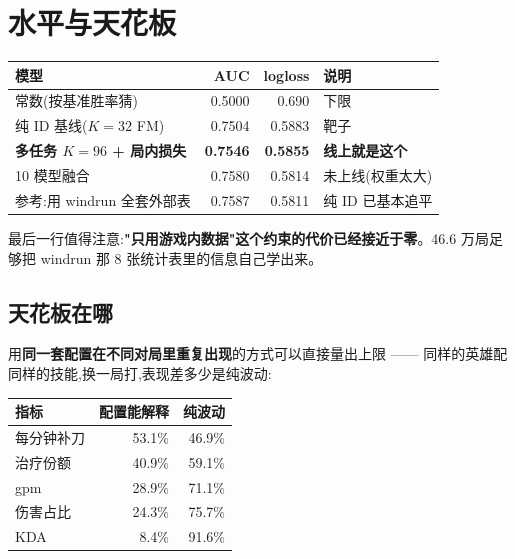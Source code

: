 \documentclass[11pt,a4paper]{article}
\newcommand{\pos}[1]{\textcolor{tealx}{#1}}
\newcommand{\negx}[1]{\textcolor{brick}{#1}}
\begin{document}
\medskip
\noindent{}

\section{水平与天花板}

\begin{center}
\begin{tabular}{@{}lrrl@{}}
\toprule
模型 & AUC & logloss & 说明\\
\midrule
常数(按基准胜率猜) & 0.5000 & 0.690 & 下限\\
纯 ID 基线($K=32$ FM) & 0.7504 & 0.5883 & 靶子\\
\textbf{多任务 $K=96$ + 局内损失} & \textbf{0.7546} & \textbf{0.5855} & \textbf{线上就是这个}\\
10 模型融合 & 0.7580 & 0.5814 & 未上线(权重太大)\\
参考:用 windrun 全套外部表 & 0.7587 & 0.5811 & 纯 ID 已基本追平\\
\bottomrule
\end{tabular}
\end{center}

最后一行值得注意:\textbf{"只用游戏内数据"这个约束的代价已经接近于零}。46.6 万局足够把 windrun 那 8 张统计表里的信息自己学出来。

\subsection{天花板在哪}

用\textbf{同一套配置在不同对局里重复出现}的方式可以直接量出上限 —— 同样的英雄配同样的技能,换一局打,表现差多少是纯波动:

\begin{center}
\begin{tabular}{@{}lrr@{}}
\toprule
指标 & 配置能解释 & 纯波动\\
\midrule
每分钟补刀 & \pos{53.1\%} & 46.9\%\\
治疗份额 & \pos{40.9\%} & 59.1\%\\
gpm & 28.9\% & 71.1\%\\
伤害占比 & 24.3\% & 75.7\%\\
KDA & \negx{8.4\%} & 91.6\%\\
\bottomrule
\end{tabular}
\end{center}
\end{document}
